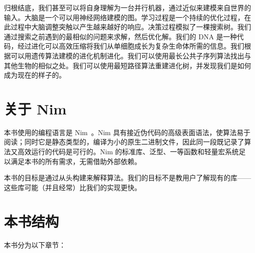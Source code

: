 \documentclass[justified, sixbynine]{tufte-book}
\theoremstyle{plain}%
\newtheorem * {corollary}{推论}
\theoremstyle{definition}
\theoremstyle{remark}
\newtheorem * {remark}{注记}
\newtheorem * {note}{注释}
\begin{document}
\begin{fullwidth}
归根结底，我们甚至可以将自身理解为一台并行机器，通过近似来建模来自世界的输入。大脑是一个可以用神经网络建模的图。学习过程是一个持续的优化过程，在此过程中大脑调整突触以产生越来越好的响应。决策过程模拟了一棵搜索树。我们通过搜索之前遇到的最相似的问题来求解，然后优化解。我们的 DNA 是一种代码，经过进化可以高效压缩将我们从单细胞成长为复杂生命体所需的信息。我们根据可以用遗传算法建模的进化机制进化。我们可以使用最长公共子序列算法找出与其他生物的相似之处。我们可以使用最短路径算法重建进化树，并发现我们是如何成为现在的样子的。

\section{关于 Nim}

本书使用的编程语言是 Nim~\cite{nim}。Nim 具有接近伪代码的高级表面语法，使算法易于阅读；同时它是静态类型的，编译为小的原生二进制文件，因此同一段既记录了算法又高效运行的代码是可行的。Nim 的标准库、泛型、一等函数和轻量宏系统足以满足本书的所有需求，无需借助外部依赖。

本书的目标是通过从头构建来解释算法。我们的目标不是教用户了解现有的库——这些库可能（并且经常）比我们的实现更快。

\section{本书结构}

本书分为以下章节：


\end{fullwidth}
\end{document}
